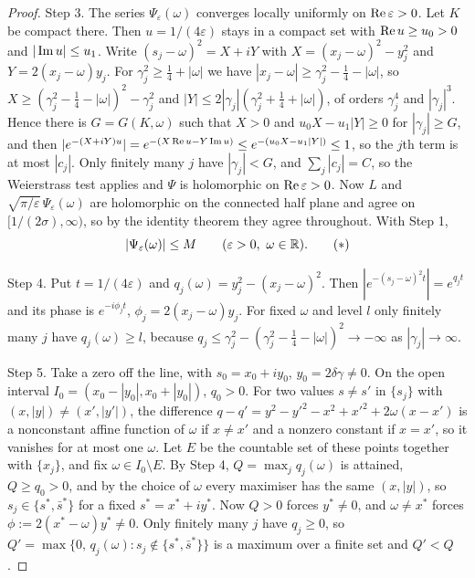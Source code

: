 \begin{proof}
Step 3. The series $\Psi_\varepsilon(\omega)$ converges locally uniformly on $\operatorname{Re}\varepsilon>0$. Let $K$ be compact there. Then $u=1/(4\varepsilon)$ stays in a compact set with $\operatorname{Re} u\ge u_0>0$ and $|\operatorname{Im} u|\le u_1$. Write $(s_j-\omega)^2=X+iY$ with $X=(x_j-\omega)^2-y_j^2$ and $Y=2(x_j-\omega)y_j$. For $\gamma_j^2\ge\frac14+|\omega|$ we have $|x_j-\omega|\ge\gamma_j^2-\frac14-|\omega|$, so $X\ge(\gamma_j^2-\frac14-|\omega|)^2-\gamma_j^2$ and $|Y|\le2|\gamma_j|(\gamma_j^2+\frac14+|\omega|)$, of orders $\gamma_j^4$ and $|\gamma_j|^3$. Hence there is $G=G(K,\omega)$ such that $X>0$ and $u_0X-u_1|Y|\ge0$ for $|\gamma_j|\ge G$, and then $|e^{-(X+iY)u}|=e^{-(X\operatorname{Re} u-Y\operatorname{Im} u)}\le e^{-(u_0X-u_1|Y|)}\le1$, so the $j$th term is at most $|c_j|$. Only finitely many $j$ have $|\gamma_j|<G$, and $\sum_j|c_j|=C$, so the Weierstrass test applies and $\Psi$ is holomorphic on $\operatorname{Re}\varepsilon>0$. Now $L$ and $\sqrt{\pi/\varepsilon}\,\Psi_\varepsilon(\omega)$ are holomorphic on the connected half plane and agree on $[1/(2\sigma),\infty)$, so by the identity theorem they agree throughout. With Step 1,
\[
|\Psi_\varepsilon(\omega)|\le M\qquad(\varepsilon>0,\ \omega\in\mathbb{R}).\tag{$*$}
\]

Step 4. Put $t=1/(4\varepsilon)$ and $q_j(\omega)=y_j^2-(x_j-\omega)^2$. Then $|e^{-(s_j-\omega)^2t}|=e^{q_jt}$ and its phase is $e^{-i\phi_jt}$, $\phi_j=2(x_j-\omega)y_j$. For fixed $\omega$ and level $l$ only finitely many $j$ have $q_j(\omega)\ge l$, because $q_j\le\gamma_j^2-(\gamma_j^2-\frac14-|\omega|)^2\to-\infty$ as $|\gamma_j|\to\infty$.

Step 5. Take a zero off the line, with $s_0=x_0+iy_0$, $y_0=2\delta\gamma\ne0$. On the open interval $I_0=(x_0-|y_0|,x_0+|y_0|)$, $q_0>0$. For two values $s\ne s'$ in $\{s_j\}$ with $(x,|y|)\ne(x',|y'|)$, the difference $q-q'=y^2-y'^2-x^2+x'^2+2\omega(x-x')$ is a nonconstant affine function of $\omega$ if $x\ne x'$ and a nonzero constant if $x=x'$, so it vanishes for at most one $\omega$. Let $E$ be the countable set of these points together with $\{x_j\}$, and fix $\omega\in I_0\setminus E$. By Step 4, $Q=\max_jq_j(\omega)$ is attained, $Q\ge q_0>0$, and by the choice of $\omega$ every maximiser has the same $(x,|y|)$, so $s_j\in\{s^*,\bar s^*\}$ for a fixed $s^*=x^*+iy^*$. Now $Q>0$ forces $y^*\ne0$, and $\omega\ne x^*$ forces $\phi:=2(x^*-\omega)y^*\ne0$. Only finitely many $j$ have $q_j\ge0$, so $Q'=\max\{0,\,q_j(\omega):s_j\notin\{s^*,\bar s^*\}\}$ is a maximum over a finite set and $Q'<Q$.


\end{proof}
